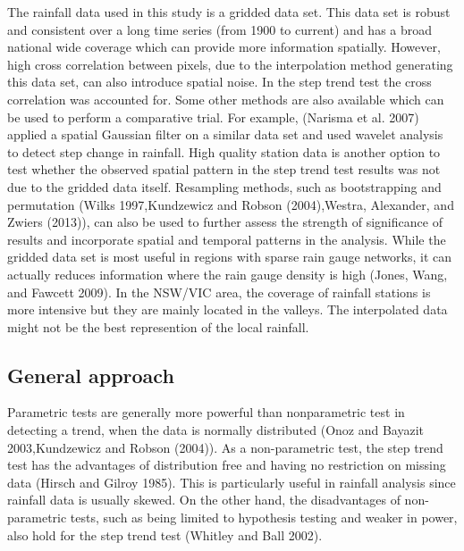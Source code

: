 \documentclass[]{elsarticle} %
\theoremstyle{definition}
\theoremstyle{definition}
\theoremstyle{definition}
\theoremstyle{remark}
\begin{document}
The rainfall data used in this study is a gridded data set. This data
set is robust and consistent over a long time series (from 1900 to
current) and has a broad national wide coverage which can provide more
information spatially. However, high cross correlation between pixels,
due to the interpolation method generating this data set, can also
introduce spatial noise. In the step trend test the cross correlation
was accounted for. Some other methods are also available which can be
used to perform a comparative trial. For example, (Narisma et al. 2007)
applied a spatial Gaussian filter on a similar data set and used wavelet
analysis to detect step change in rainfall. High quality station data is
another option to test whether the observed spatial pattern in the step
trend test results was not due to the gridded data itself. Resampling
methods, such as bootstrapping and permutation (Wilks 1997,Kundzewicz
and Robson (2004),Westra, Alexander, and Zwiers (2013)), can also be
used to further assess the strength of significance of results and
incorporate spatial and temporal patterns in the analysis. While the
gridded data set is most useful in regions with sparse rain gauge
networks, it can actually reduces information where the rain gauge
density is high (Jones, Wang, and Fawcett 2009). In the NSW/VIC area,
the coverage of rainfall stations is more intensive but they are mainly
located in the valleys. The interpolated data might not be the best
represention of the local rainfall.

\subsection{General approach}\label{general-approach}

Parametric tests are generally more powerful than nonparametric test in
detecting a trend, when the data is normally distributed (Onoz and
Bayazit 2003,Kundzewicz and Robson (2004)). As a non-parametric test,
the step trend test has the advantages of distribution free and having
no restriction on missing data (Hirsch and Gilroy 1985). This is
particularly useful in rainfall analysis since rainfall data is usually
skewed. On the other hand, the disadvantages of non-parametric tests,
such as being limited to hypothesis testing and weaker in power, also
hold for the step trend test (Whitley and Ball 2002).
\end{document}
